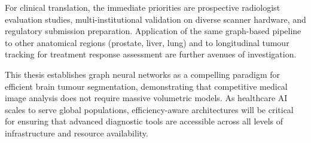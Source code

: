 For clinical translation, the immediate priorities are prospective radiologist evaluation studies, multi-institutional validation on diverse scanner hardware, and regulatory submission preparation. Application of the same graph-based pipeline to other anatomical regions (prostate, liver, lung) and to longitudinal tumour tracking for treatment response assessment are further avenues of investigation.

This thesis establishes graph neural networks as a compelling paradigm for efficient brain tumour segmentation, demonstrating that competitive medical image analysis does not require massive volumetric models. As healthcare AI scales to serve global populations, efficiency-aware architectures will be critical for ensuring that advanced diagnostic tools are accessible across all levels of infrastructure and resource availability.